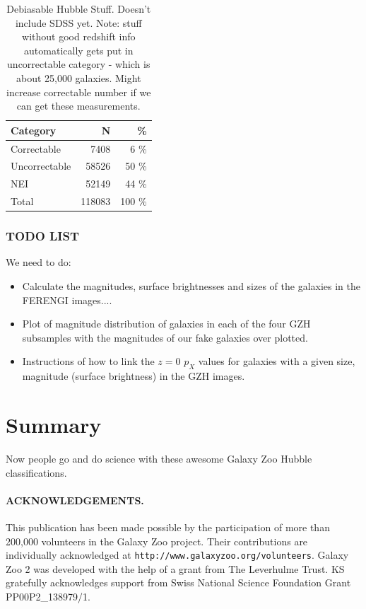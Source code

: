 \documentclass[usenatbib]{mn2e}
\begin{document}
\begin{table}
\caption{Debiasable Hubble Stuff. Doesn't include SDSS yet. Note: stuff without good redshift info automatically gets put in uncorrectable category - which is about 25,000 galaxies. Might increase correctable number if we can get these measurements. \label{hubble_debiasable}}
\begin{tabular}{lrr}
\hline\hline
Category &  N & \% \\
\hline
Correctable   & 7408 & 6 \%  \\
Uncorrectable & 58526 & 50 \%\\
NEI           & 52149 & 44 \% \\
Total         & 118083 & 100 \% \\
\hline\hline
\end{tabular}
\end{table}


\subsubsection{TODO LIST}
We need to do: 
\begin{itemize}
\item Calculate the magnitudes, surface brightnesses and sizes of the galaxies in the FERENGI images....
\item Plot of magnitude distribution of galaxies in each of the four GZH subsamples with the magnitudes of our fake galaxies over plotted. 
\item Instructions of how to link the $z=0$ $p_X$ values for galaxies with a given size, magnitude (surface brightness) in the GZH images. 
\end{itemize}



\section{Summary}

Now people go and do science with these awesome Galaxy Zoo Hubble classifications.  
 
 
\paragraph*{ACKNOWLEDGEMENTS.} 

This publication has been made possible by the participation of more than 200,000 volunteers in the Galaxy Zoo project. Their contributions are individually acknowledged at \texttt{http://www.galaxyzoo.org/volunteers}. Galaxy Zoo 2 was developed with the help of a grant from The Leverhulme Trust. KS gratefully acknowledges support from Swiss National Science Foundation Grant PP00P2\_138979/1.
\end{document}
